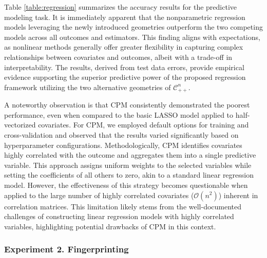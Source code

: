 \documentclass[10pt]{article}
\newcommand{\CORR}{\mathcal{C}_{++}^n}
\begin{document}
Table \ref{table:regression} summarizes the accuracy results for the predictive modeling task. It is immediately apparent that the nonparametric regression models leveraging the newly introduced geometries outperform the two competing models across all outcomes and estimators. This finding aligns with expectations, as nonlinear methods generally offer greater flexibility in capturing complex relationships between covariates and outcomes, albeit with a trade-off in interpretability. The results, derived from test data errors, provide empirical evidence supporting the superior predictive power of the proposed regression framework utilizing the two alternative geometries of $\CORR$.

A noteworthy observation is that CPM consistently demonstrated the poorest performance, even when compared to the basic LASSO model applied to half-vectorized covariates. For CPM, we employed default options for training and cross-validation and observed that the results varied significantly based on hyperparameter configurations. Methodologically, CPM identifies covariates highly correlated with the outcome and aggregates them into a single predictive variable. This approach assigns uniform weights to the selected variables while setting the coefficients of all others to zero, akin to a standard linear regression model. However, the effectiveness of this strategy becomes questionable when applied to the large number of highly correlated covariates ($\mathcal{O}(n^2)$) inherent in correlation matrices. This limitation likely stems from the well-documented challenges of constructing linear regression models with highly correlated variables, highlighting potential drawbacks of CPM in this context.








\subsubsection{Experiment 2. Fingerprinting}
\end{document}
